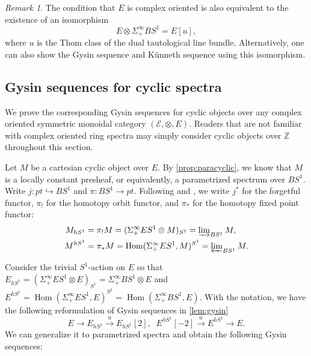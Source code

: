 \documentclass[11pt]{amsart}
\numberwithin{equation}{section}
\theoremstyle{plain}
\theoremstyle{definition}
\theoremstyle{remark}
\newtheorem{RMK}[rmk]{Remark}
\newcommand{\bZ} { {\mathbb{Z}}}
\newcommand{\cE} { {\mathcal{E}}}
\newcommand\Hom{\operatorname{Hom}}
\begin{document}
\begin{RMK}
The condition that $E$ is complex oriented is also equivalent to the existence of an isomorphism 
\[E \otimes \Sigma^\infty_+BS^1 = E[u],\]
where $u$ is the Thom class of the dual tautological line bundle. Alternatively, one can also show the Gysin sequence and K\"unneth sequence using this isomorphism.
\end{RMK}

  



\subsection{Gysin sequences for cyclic spectra}\label{section: Gysin in general}
We prove the corresponding Gysin sequences for cyclic objects over any complex oriented symmetric monoidal category $(\cE, \otimes, E)$. Readers that are not familiar with complex oriented ring spectra may simply consider cyclic objects over $\bZ$ throughout this section.

Let $M$ be a cartesian cyclic object over $E$. By \autoref{prop:paracyclic}, we know that $M$ is a locally constant presheaf, or equivalently, a parametrized spectrum over $BS^1$. Write $j: pt \hookrightarrow BS^1$ and $\pi: BS^1 \to pt$. Following \cite[Example 6.1.6.2]{HA} and \cite[Example I.1.12]{Nikolaus-Scholze-Ontopologicalcyclichomology}, we write $j^*$ for the forgetful functor, $\pi_!$ for the homotopy orbit functor, and $\pi_*$ for the homotopy fixed point functor:
\begin{align*}
    M_{hS^1} &= \pi_!M = (\Sigma^\infty_+ES^1 \otimes M)_{S^1} =\varinjlim\nolimits_{BS^1}M, \\
    M^{hS^1} &= \pi_*M = \Hom(\Sigma^\infty_+ES^1, M)^{S^1}=\varprojlim\nolimits_{BS^1}M.
\end{align*}


Consider the trivial $S^1$-action on $E$ so that $E_{hS^1} = (\Sigma^\infty_+ES^1 \otimes E)_{S^1} = \Sigma^\infty_+BS^1 \otimes E$ and $E^{hS^1} = \Hom(\Sigma^\infty_+ES^1, E)^{S^1} = \Hom(\Sigma^\infty_+BS^1, E)$. With the notation, we have the following reformulation of Gysin sequences in \autoref{lem:gysin}
\[E \to E_{hS^1} \xrightarrow{u} E_{hS^1}[2], \;\; E^{hS^1}[-2] \xrightarrow{u} E^{hS^1} \to E.\]
We can generalize it to parametrized spectra and obtain the following Gysin sequences: 
\end{document}

